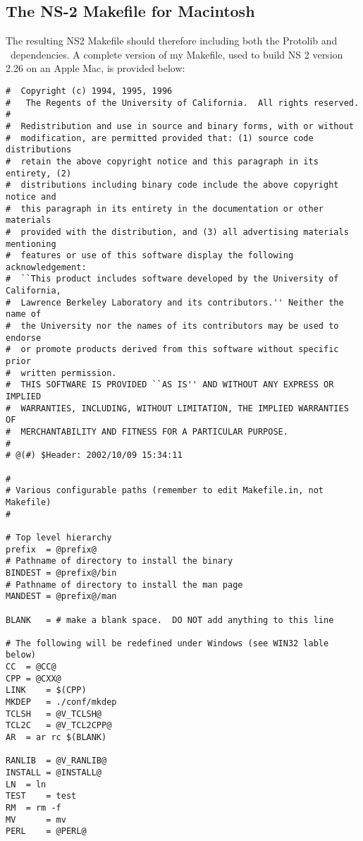\subsection{The NS-2 Makefile for Macintosh}
\label{install:p2ps-ns2-build}

The resulting NS2 Makefile should therefore including both the
Protolib and \agentj~dependencies. A complete version of my 
Makefile, used to build NS 2 version 2.26 on an Apple Mac, 
is provided below:

\footnotesize
\begin{verbatim}
#  Copyright (c) 1994, 1995, 1996
# 	The Regents of the University of California.  All rights reserved.
#
#  Redistribution and use in source and binary forms, with or without
#  modification, are permitted provided that: (1) source code distributions
#  retain the above copyright notice and this paragraph in its entirety, (2)
#  distributions including binary code include the above copyright notice and
#  this paragraph in its entirety in the documentation or other materials
#  provided with the distribution, and (3) all advertising materials mentioning
#  features or use of this software display the following acknowledgement:
#  ``This product includes software developed by the University of California,
#  Lawrence Berkeley Laboratory and its contributors.'' Neither the name of
#  the University nor the names of its contributors may be used to endorse
#  or promote products derived from this software without specific prior
#  written permission.
#  THIS SOFTWARE IS PROVIDED ``AS IS'' AND WITHOUT ANY EXPRESS OR IMPLIED
#  WARRANTIES, INCLUDING, WITHOUT LIMITATION, THE IMPLIED WARRANTIES OF
#  MERCHANTABILITY AND FITNESS FOR A PARTICULAR PURPOSE.
#
# @(#) $Header: 2002/10/09 15:34:11

#
# Various configurable paths (remember to edit Makefile.in, not Makefile)
#

# Top level hierarchy
prefix	= @prefix@
# Pathname of directory to install the binary
BINDEST	= @prefix@/bin
# Pathname of directory to install the man page
MANDEST	= @prefix@/man

BLANK	= # make a blank space.  DO NOT add anything to this line

# The following will be redefined under Windows (see WIN32 lable below)
CC	= @CC@
CPP	= @CXX@
LINK	= $(CPP)
MKDEP	= ./conf/mkdep
TCLSH	= @V_TCLSH@
TCL2C	= @V_TCL2CPP@
AR	= ar rc $(BLANK)

RANLIB	= @V_RANLIB@
INSTALL	= @INSTALL@
LN	= ln
TEST	= test
RM	= rm -f
MV      = mv
PERL	= @PERL@


\end{verbatim}
